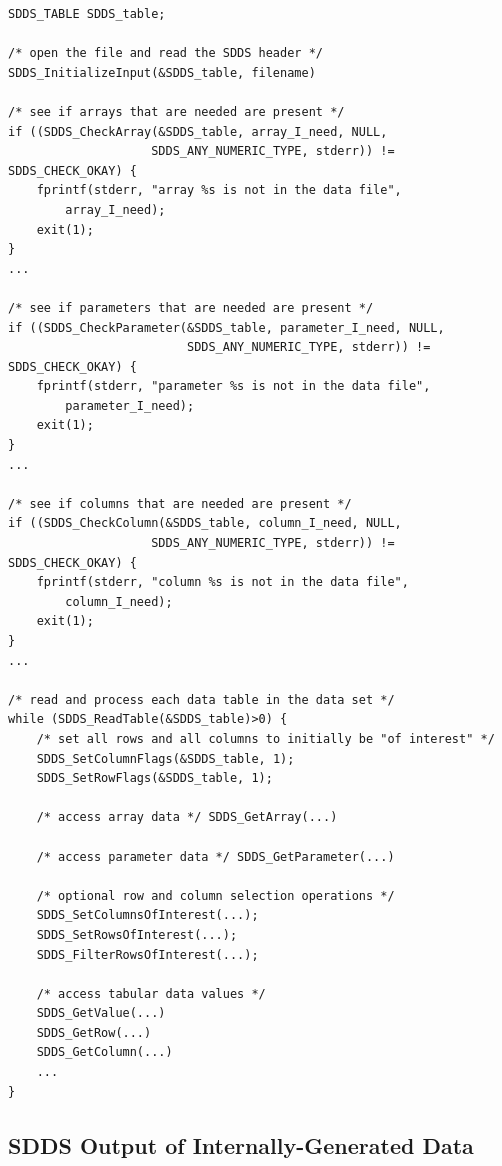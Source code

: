 \documentclass[11pt]{article}
\begin{document}
\begin{verbatim}
SDDS_TABLE SDDS_table;

/* open the file and read the SDDS header */ 
SDDS_InitializeInput(&SDDS_table, filename)

/* see if arrays that are needed are present */
if ((SDDS_CheckArray(&SDDS_table, array_I_need, NULL, 
                    SDDS_ANY_NUMERIC_TYPE, stderr)) != SDDS_CHECK_OKAY) {
    fprintf(stderr, "array %s is not in the data file", 
        array_I_need); 
    exit(1); 
} 
...

/* see if parameters that are needed are present */ 
if ((SDDS_CheckParameter(&SDDS_table, parameter_I_need, NULL, 
                         SDDS_ANY_NUMERIC_TYPE, stderr)) != SDDS_CHECK_OKAY) {
    fprintf(stderr, "parameter %s is not in the data file", 
        parameter_I_need); 
    exit(1); 
} 
...

/* see if columns that are needed are present */ 
if ((SDDS_CheckColumn(&SDDS_table, column_I_need, NULL, 
                    SDDS_ANY_NUMERIC_TYPE, stderr)) != SDDS_CHECK_OKAY) {
    fprintf(stderr, "column %s is not in the data file", 
        column_I_need); 
    exit(1); 
} 
...

/* read and process each data table in the data set */ 
while (SDDS_ReadTable(&SDDS_table)>0) { 
    /* set all rows and all columns to initially be "of interest" */ 
    SDDS_SetColumnFlags(&SDDS_table, 1); 
    SDDS_SetRowFlags(&SDDS_table, 1);

    /* access array data */ SDDS_GetArray(...)

    /* access parameter data */ SDDS_GetParameter(...)

    /* optional row and column selection operations */ 
    SDDS_SetColumnsOfInterest(...); 
    SDDS_SetRowsOfInterest(...); 
    SDDS_FilterRowsOfInterest(...);

    /* access tabular data values */ 
    SDDS_GetValue(...) 
    SDDS_GetRow(...) 
    SDDS_GetColumn(...) 
    ... 
}
\end{verbatim}

\subsection{SDDS Output of Internally-Generated Data}
\end{document}
